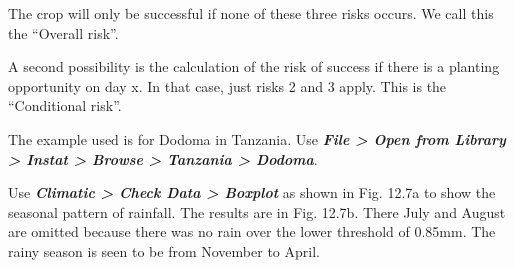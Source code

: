 \documentclass[
  letterpaper,
  DIV=11,
  numbers=noendperiod]{scrreprt}
\begin{document}
The crop will only be successful if none of these three risks occurs. We
call this the ``Overall risk''.

A second possibility is the calculation of the risk of success if there
is a planting opportunity on day x. In that case, just risks 2 and 3
apply. This is the ``Conditional risk''.

The example used is for Dodoma in Tanzania. Use \textbf{\emph{File
\textgreater{} Open from Library \textgreater{} Instat \textgreater{}
Browse \textgreater{} Tanzania \textgreater{} Dodoma}}.

Use \textbf{\emph{Climatic \textgreater{} Check Data \textgreater{}
Boxplot}} as shown in Fig. 12.7a to show the seasonal pattern of
rainfall. The results are in Fig. 12.7b. There July and August are
omitted because there was no rain over the lower threshold of 0.85mm.
The rainy season is seen to be from November to April.
\end{document}
